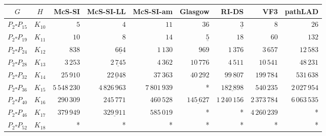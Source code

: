 
\begin{tabular}{ccrrrrrrr}
    \toprule
    {$G$} & {$H$} & {McS-SI} & {McS-SI-LL} & {McS-SI-am} & Glasgow & RI-DS & VF3 & pathLAD \\ 
    \midrule

$P_2\square P_{15}$ & $K_{10}$ & $5$ & $4$ & $11$ & $36$ & $\underline{3}$ & $8$ & $26$\\
$P_2\square P_{19}$ & $K_{11}$ & $10$ & $8$ & $14$ & $\underline{5}$ & $18$ & $60$ & $132$\\
$P_2\square P_{24}$ & $K_{12}$ & $838$ & $\underline{664}$ & $1\,130$ & $969$ & $1\,376$ & $3\,657$ & $12\,583$\\
$P_2\square P_{28}$ & $K_{13}$ & $3\,253$ & $\underline{2\,745}$ & $4\,362$ & $10\,776$ & $4\,511$ & $10\,541$ & $48\,231$\\
$P_2\square P_{32}$ & $K_{14}$ & $25\,910$ & $\underline{22\,048}$ & $37\,363$ & $40\,292$ & $99\,807$ & $199\,784$ & $531\,638$\\
$P_2\square P_{36}$ & $K_{15}$ & $5\,548\,230$ & $4\,826\,963$ & $7\,801\,939$ & * & $\underline{182\,898}$ & $540\,235$ & $2\,027\,954$\\
$P_2\square P_{40}$ & $K_{16}$ & $290\,309$ & $245\,771$ & $460\,528$ & $\underline{145\,627}$ & $1\,240\,156$ & $2\,373\,784$ & $6\,063\,535$\\
$P_2\square P_{46}$ & $K_{17}$ & $379\,949$ & $\underline{329\,911}$ & $585\,019$ & * & * & $4\,260\,239$ & *\\
$P_2\square P_{52}$ & $K_{18}$ & * & * & * & * & * & * & *\\

    \bottomrule
\end{tabular}


